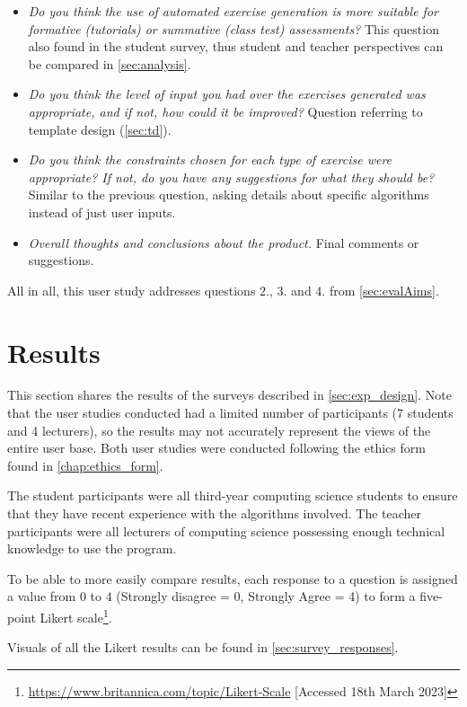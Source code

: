\documentclass{l4proj}
\begin{document}
\begin{itemize}
	\item
	\emph{Do you think the use of automated exercise generation is more suitable for formative (tutorials) or summative (class test) assessments?} This question also found in the student survey, thus student and teacher perspectives can be compared in \autoref{sec:analysis}. 
	\item
	\emph{Do you think the level of input you had over the exercises generated was appropriate, and if not, how could it be improved?} Question referring to template design (\autoref{sec:td}).
	\item
	\emph{Do you think the constraints chosen for each type of exercise were appropriate? If not, do you have any suggestions for what they should be?} Similar to the previous question, asking details about specific algorithms instead of just user inputs.
	\item
	\emph{Overall thoughts and conclusions about the product.} Final comments or suggestions.
\end{itemize}

All in all, this user study addresses questions $2.$, $3.$ and $4.$ from \autoref{sec:evalAims}.

\section{Results}
\label{sec:results}

This section shares the results of the surveys described in \autoref{sec:exp_design}. Note that the user studies conducted had a limited number of participants (7 students and 4 lecturers), so the results may not accurately represent the views of the entire user base. Both user studies were conducted following the ethics form found in \autoref{chap:ethics_form}.

The student participants were all third-year computing science students to ensure that they have recent experience with the algorithms involved. The teacher participants were all lecturers of computing science possessing enough technical knowledge to use the program.

To be able to more easily compare results, each response to a question is assigned a value from $0$ to $4$ (Strongly disagree = 0, Strongly Agree = 4) to form a five-point Likert scale\footnote{\url{https://www.britannica.com/topic/Likert-Scale} [Accessed 18th March 2023]}.

Visuals of all the Likert results can be found in \autoref{sec:survey_responses}.
\end{document}
